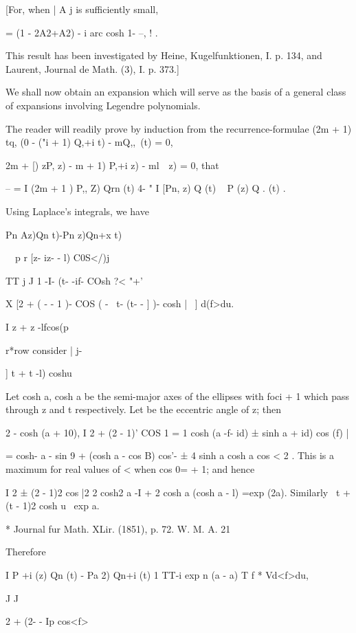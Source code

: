 {{{[For, when | A j is sufficiently small,

= (1 - 2A2+A2) - i arc cosh 1- --, ! .

This result has been investigated by Heine, Kugelfunktionen, I. p.
134, and Laurent, Journal de Math. (3), I. p. 373.]


We shall now obtain an expansion which will serve as the basis of a
general class of expansions involving Legendre polynomials.

The reader will readily prove by induction from the
recurrence-formulae (2m + 1) tq, (0 - ("i + 1) Q,+i t) - mQ,,\, (t)
= 0,

 2m + [) zP, z) - m + 1) P,+i z) - ml\ \, z) = 0, that

-- = I (2m + 1 ) P,, Z) Qrn (t) 4- " I [Pn, z) Q (t) ~ P (z) Q . (t)
.

Using Laplace's integrals, we have

Pn Az)Qn t)-Pn z)Qn+x t)

\ \ p r [z- iz- - l) C0S</)j

TT j J 1 -I- (t- -if- COsh ?< "+'

X [2 + ( - - 1 )- COS ( - \ t- (t- - ] )- cosh |~ ] d(f>du.

I z + z -lfcos(p

r*row consider | j-

] t + t -l) coshu

Let cosh a, cosh a be the semi-major axes of the ellipses with foci +
1 which pass through z and t respectively. Let be the eccentric angle
of z; then

2 - cosh (a + 10), I 2 + (2 - 1)' COS 1 = 1 cosh (a -f- id) ± sinh a +
id) cos (f) |

= cosh- a - sin 9 + (cosh a - cos B) cos'- ± 4 sinh a cosh a cos < 2 .
This is a maximum for real values of < when cos 0= + 1; and hence

I 2 ± (2 - 1)2 cos |2 2 cosh2 a -I + 2 cosh a (cosh a - l) =exp (2a).
Similarly \ t + (t - 1)2 cosh u \ exp a.

* Journal fur Math. XLir. (1851), p. 72. W. M. A. 21

%
%

Therefore

I P +i (z) Qn (t) - Pa 2) Qn+i (t) 1 TT-i exp n (a - a) T f * Vd<f>du,

J J

2 + (2- - Ip cos<f>

}}}
